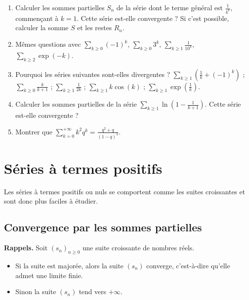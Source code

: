 \documentclass[class=report,crop=false]{standalone}
\begin{document}
\begin{miniexercices}
\begin{enumerate}
  
  \item Calculer les sommes partielles $S_n$ de la série dont le terme général est 
  $\frac{1}{4^k}$, commençant à $k=1$. Cette série est-elle convergente ? 
  Si c'est possible, calculer la somme $S$ et les restes $R_n$.
  
  \item Mêmes questions avec $\sum_{k\ge0} (-1)^k$, $\sum_{k\ge0} 3^k$, 
  $\sum_{k\ge1} \frac{1}{10^k}$, $\sum_{k\ge2} \exp(-k)$.
  
 \item Pourquoi les séries suivantes sont-elles divergentes ?
  $\sum_{k\ge1} \left( \frac1k + (-1)^k \right)$ ; $\sum_{k\ge 0} \frac{k}{k+1}$ ; 
  $\sum_{k\ge1} \frac{1}{2k}$ ;
  $\sum _{k\ge1} k \cos(k)$ ; $\sum_{k\ge1} \exp(\frac1k)$.
    
   
  \item Calculer les sommes partielles de la série 
  $\sum_{k\ge1} \ln\left( 1-\frac{1}{k+1} \right)$. 
  Cette série est-elle convergente ?
  
  \item Montrer que $\displaystyle \sum_{k=0}^{+\infty} k^2q^k = \frac{q^2+q}{(1-q)^3}$.

\end{enumerate}
\end{miniexercices}



\section{Séries à termes positifs}

Les séries à termes positifs ou nuls se comportent comme les suites croissantes
et sont donc plus faciles à étudier.


\subsection{Convergence par les sommes partielles}

\textbf{Rappels.}
Soit $(s_n)_{n\ge0}$ une suite croissante de nombres réels.
\begin{itemize}
  \item Si la suite est majorée, alors la suite $(s_n)$ converge, c'est-à-dire
  qu'elle admet une limite finie.
  \item Sinon la suite $(s_n)$ tend vers $+\infty$.
\end{itemize}
\end{document}

